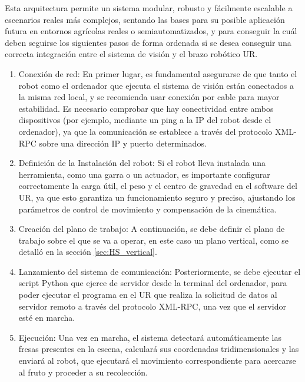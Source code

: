 Esta arquitectura permite un sistema modular, robusto y fácilmente escalable a escenarios reales más complejos, sentando las bases para su posible aplicación futura en entornos agrícolas reales o semiautomatizados, y para conseguir la cuál deben seguirse los siguientes pasos de forma ordenada si se desea conseguir una correcta integración entre el sistema de visión y el brazo robótico UR.

\begin{enumerate}
  \item Conexión de red: En primer lugar, es fundamental asegurarse de que tanto el robot como el ordenador que ejecuta el sistema de visión están conectados a la misma red local, y se recomienda usar conexión por cable para mayor estabilidad. Es necesario comprobar que hay conectividad entre ambos dispositivos (por ejemplo, mediante un ping a la IP del robot desde el ordenador), ya que la comunicación se establece a través del protocolo XML-RPC sobre una dirección IP y puerto determinados.
  \item Definición de la Instalación del robot: Si el robot lleva instalada una herramienta, como una garra o un actuador, es importante configurar correctamente la carga útil, el peso y el centro de gravedad en el software del UR, ya que esto garantiza un funcionamiento seguro y preciso, ajustando los parámetros de control de movimiento y compensación de la cinemática.
  \item Creación del plano de trabajo: A continuación, se debe definir el plano de trabajo sobre el que se va a operar, en este caso un plano vertical, como se detalló en la sección \ref{sec:HS_vertical}. 
  \item Lanzamiento del sistema de comunicación: Posteriormente, se debe ejecutar el script Python que ejerce de servidor desde la terminal del ordenador, para poder ejecutar el programa en el UR que realiza la solicitud de datos al servidor remoto a través del protocolo XML-RPC, una vez que el servidor esté en marcha.
  \item Ejecución: Una vez en marcha, el sistema detectará automáticamente las fresas presentes en la escena, calculará sus coordenadas tridimensionales y las enviará al robot, que ejecutará el movimiento correspondiente para acercarse al fruto y proceder a su recolección.
\end{enumerate}

\vspace{20mm}

